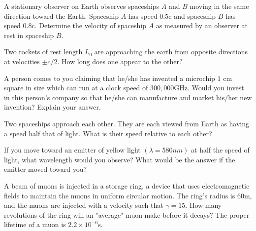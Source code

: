 \begin{q}
	A stationary observer on Earth observes spaceships $ A $ and $ B $ moving in the same direction toward the Earth. Spaceship $ A $ has speed $ 0.5 $c and spaceship $ B $ has speed $ 0.8 $c. Determine the velocity of spaceship $ A $ as measured by an observer at rest in spaceship $ B $.
\end{q}
\begin{q}
	Two rockets of rest length $ L_0 $ are approaching the earth from opposite directions at velocities $ \pm c/2 $. How long does one appear to the other?
\end{q}
\begin{q}
	A person comes to you claiming that he/she has invented a microchip $ 1 $ cm square in size which can run at a clock speed of $ 300,000  $GHz.
	Would you invest in this person's company so that he/she can manufacture and market his/her new invention? Explain your answer. 
\end{q}
\begin{q}
	Two spaceships approach each other. They are each viewed from Earth as having a speed half that of light. What is their speed relative to each other?
\end{q}
\begin{q}
	If you move toward an emitter of yellow light $ (\lambda = 580nm) $ at half the speed of light, what wavelength would you observe? What would be the answer if the emitter moved toward you?
\end{q}
\begin{q}
	A beam of muons is injected in a storage ring, a device that uses electromagnetic fields to maintain the muons in uniform circular motion. The ring's radius is $ 60 $m, and the muons are injected with a velocity such that $ \gamma = 15 $. How many revolutions of the ring will an "average" muon make before it decays? The proper lifetime of a muon is $ 2.2 \times 10^{-6} $s.
\end{q}










